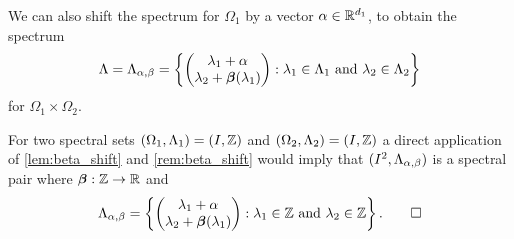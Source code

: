 \documentclass[../thesis.tex]{subfiles}
\begin{document}
\begin{remark}\label{rem:beta_shift}
    We can also shift the spectrum for $\Omega_1$ by a vector $\alpha \in \mathbb{R}^{d_1}$, to obtain the spectrum 
    \begin{equation*}
        \Lambda = \Lambda_{\alpha,\beta} 
        = \left\{\begin{pmatrix}
            \lambda_1 +\alpha\\
            \lambda_2+\bm{\beta}(\lambda_1)
            \end{pmatrix}
        : \lambda_1 \in \Lambda_1 \text{ and } \lambda_2 \in \Lambda_2\right\}
    \end{equation*}
    for $\Omega_1 \times \Omega_2$.
\end{remark}

\begin{example}
    For two spectral sets $(\Omega_1,\Lambda_1)=(I, \mathbb{Z})$ and $(\Omega_2,\Lambda_2)=(I, \mathbb{Z})$ a direct application of \cref{lem:beta_shift} and \cref{rem:beta_shift} would imply that $(I^2,\Lambda_{\alpha,\beta})$ is a spectral pair where $\bm{\beta}: \mathbb{Z} \rightarrow \mathbb{R}$ and
    \begin{equation*}
        \Lambda_{\alpha,\beta} 
        = \braqMed{\begin{pmatrix}
            \lambda_1 +\alpha\\
            \lambda_2+\betafunc(\lambda_1) %
            \end{pmatrix}
        : \lambda_1 \in \Z \text{ and } \lambda_2 \in \Z}. \qedhere
    \end{equation*}
\end{example}
\end{document}
